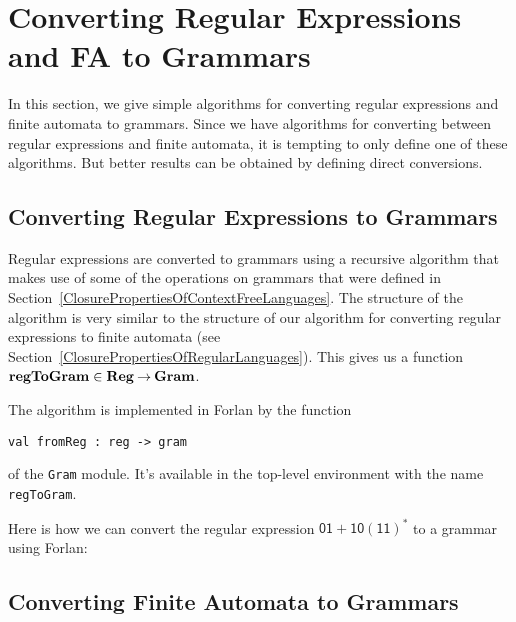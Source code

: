 \section{Converting Regular Expressions and FA to Grammars}
\label{ConvertingRegularExpressionsAndFAToGrammars}

%
%
%
%

In this section, we give simple algorithms for converting regular
expressions and finite automata to grammars.  Since we have algorithms
for converting between regular expressions and finite automata, it is
tempting to only define one of these algorithms.  But better results
can be obtained by defining direct conversions.

\subsection{Converting Regular Expressions to Grammars}

Regular expressions are converted to grammars using a recursive
algorithm that makes use of some of the operations on grammars that
were defined in Section~\ref{ClosurePropertiesOfContextFreeLanguages}.
The structure of the algorithm is very similar to the structure of our
algorithm for converting regular expressions to finite automata (see
Section~\ref{ClosurePropertiesOfRegularLanguages}).  This
gives us a function $\mathbf{regToGram}\in\mathbf{Reg}\mathbin{\to}\mathbf{Gram}$.
%
%

The algorithm is implemented in Forlan by the function
\begin{verbatim}
val fromReg : reg -> gram
\end{verbatim}
%
of the \texttt{Gram} module.  It's available in the top-level
environment with the name \texttt{regToGram}.
%
%

Here is how we can convert the regular expression $\mathsf{01 +
10(11)^*}$ to a grammar using Forlan:


\subsection{Converting Finite Automata to Grammars}


